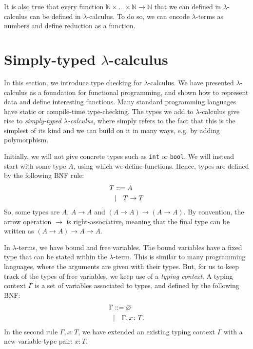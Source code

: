 \documentclass[a4paper, openany]{memoir}
\theoremstyle{definition}
\begin{document}
    It is also true that every function $\mathbb{N} \times \dots \times \mathbb{N} \to \mathbb{N}$ that we can defined in $\lambda$-calculus can be defined in $\lambda$-calculus. To do so, we can encode $\lambda$-terms as numbers and define reduction as a function.
    \newpage

    \section{Simply-typed $\lambda$-calculus}
    In this section, we introduce type checking for $\lambda$-calculus. We have presented $\lambda$-calculus as a foundation for functional programming, and shown how to represent data and define interesting functions. Many standard programming languages have static or compile-time type-checking. The types we add to $\lambda$-calculus give rise to \emph{simply-typed $\lambda$-calculus}, where simply refers to the fact that this is the simplest of its kind and we can build on it in many ways, e.g. by adding polymorphism.

    Initially, we will not give concrete types such as \texttt{int} or \texttt{bool}. We will instead start with some type $A$, using which we define functions. Hence, types are defined by the following BNF rule:
    \begin{align*}
        T &::= A \\
        &| \hspace*{10pt} T \to T
    \end{align*}
    So, some types are $A$, $A \to A$ and $(A \to A) \to (A \to A)$. By convention, the arrow operation $\to$ is right-associative, meaning that the final type can be written as $(A \to A) \to A \to A$.

    In $\lambda$-terms, we have bound and free variables. The bound variables have a fixed type that can be stated within the $\lambda$-term. This is similar to many programming languages, where the arguments are given with their types. But, for us to keep track of the types of free variables, we keep use of a \emph{typing context}. A typing context $\Gamma$ is a set of variables associated to types, and defined by the following BNF:
    \begin{align*}
        \Gamma &::= \varnothing \\
        &| \hspace*{10pt} \Gamma, x \colon T.
    \end{align*}
    In the second rule $\Gamma, x \colon T$, we have extended an existing typing context $\Gamma$ with a new variable-type pair: $x \colon T$.
\end{document}
